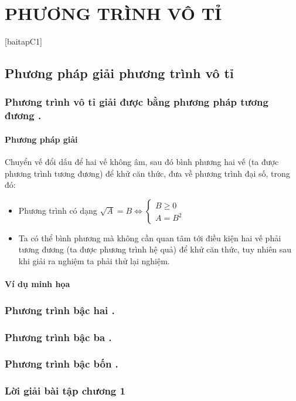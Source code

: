 \part{PHƯƠNG TRÌNH VÔ TỈ}%
\minitoc %

\thispagestyle{empty}
[baitapC1]
\vspace*{1cm}
\chapter{Phương pháp giải phương trình vô tỉ}
\section{Phương trình vô tỉ giải được bằng phương pháp tương đương .}
  \subsection{Phương pháp giải }
    Chuyển vế đổi dấu để hai vế không âm, sau đó bình phương hai vế (ta được phương trình tương đương) để khử căn thức, đưa về phương trình đại số, trong đó: 
        \begin{itemize}
          \item Phương trình có dạng $	\sqrt{A}=B \Leftrightarrow \begin{cases} B \geq 0 \\ A = B^2 \end{cases}$
          \item Ta có thể bình phương mà không cần quan tâm tới điều kiện hai vế phải tương đương (ta được phương trình hệ quả) để khử căn thức, tuy nhiên sau khi giải ra nghiệm ta phải thử lại nghiệm.

        
      
        \end{itemize} 

      \subsection{Ví dụ minh họa}
\section{Phương trình bậc hai  .}



\section{Phương trình bậc ba .}

\section{Phương trình bậc bốn .}
\section*{Lời giải bài tập chương 1}
{\small}
